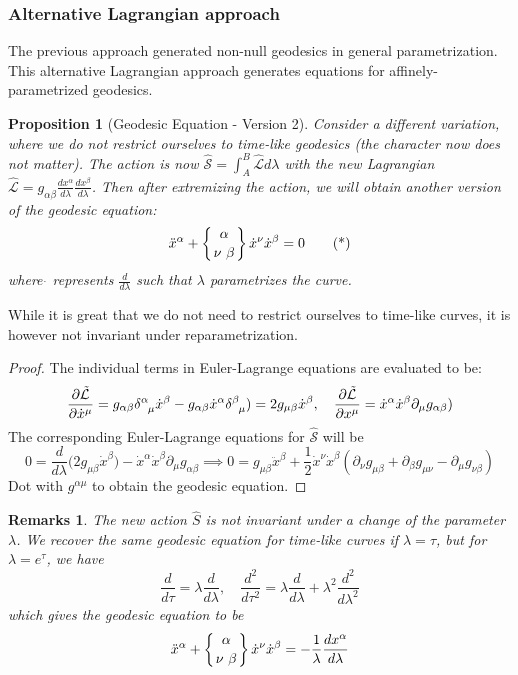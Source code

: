 \documentclass[a4paper]{article}
\newtheorem{remarks}{Remarks}[section]
\theoremstyle{new}
\newtheorem{prop}{Proposition}[section]
\begin{document}
\subsubsection*{Alternative Lagrangian approach}
The previous approach generated non-null geodesics in general parametrization. This alternative Lagrangian approach generates equations for affinely-parametrized geodesics.
\begin{prop}[Geodesic Equation - Version 2]
Consider a different variation, where we do not restrict ourselves to time-like geodesics (the character now does not matter). The action is now $\hat{\mathcal{S}}=\int_A^B\hat{\mathcal{L}}d\lambda$ with the new Lagrangian $\hat{\mathcal{L}}=g_{\alpha\beta}\frac{dx^\alpha}{d\lambda}\frac{dx^\beta}{d\lambda}$. Then after extremizing the action, we will obtain another version of the geodesic equation:
\begin{equation}
    \ddot{x}^\alpha+ \left \{ {\alpha \atop
\nu\ \beta}\right\} \dot{x}^\nu\dot{x}^\beta=0\tag{*}
\end{equation}
where $\dot{ }$ represents $\frac{d}{d\lambda}$ such that $\lambda$ parametrizes the curve. 
\end{prop}
While it is great that we do not need to restrict ourselves to time-like curves, it is however not invariant under reparametrization. 
\begin{proof}
The individual terms in Euler-Lagrange equations are evaluated to be:
$$\frac{\partial\tilde{\mathcal{L}}}{\partial\dot{x}^\mu}=g_{\alpha\beta}\tensor*{\delta}{*_{}^{\alpha}_{\mu}}\dot{x}^\beta-g_{\alpha\beta}\dot{x}^\alpha\tensor*{\delta}{*_{}^{\beta}_{\mu}})=2g_{\mu\beta}\dot{x}^\beta,\quad\frac{\partial\tilde{\mathcal{L}}}{\partial x^\mu}=\dot{x}^\alpha\dot{x}^\beta\partial_\mu g_{\alpha\beta})$$
The corresponding Euler-Lagrange equations for $\hat{\mathcal{S}}$ will be 
$$0=\frac{d}{d\lambda}\bigg(2g_{\mu\beta}\dot{x}^\beta\bigg)-\dot{x}^\alpha\dot{x}^\beta\partial_\mu g_{\alpha\beta}\implies 0=g_{\mu\beta}\ddot{x}^\beta+\frac{1}{2}\dot{x}^\nu\dot{x}^\beta(\partial_\nu g_{\mu\beta}+\partial_\beta g_{\mu\nu}-\partial_\mu g_{\nu\beta})$$
Dot with $g^{\alpha\mu}$ to obtain the geodesic equation.
\end{proof}
\begin{remarks}
The new action $\hat{S}$ is not invariant under a change of the parameter $\lambda$. We recover the same geodesic equation for time-like curves if $\lambda=\tau$, but for $\lambda=e^\tau$, we have
$$\frac{d}{d\tau}=\lambda\frac{d}{d\lambda},\quad\frac{d^2}{d\tau^2}=\lambda\frac{d}{d\lambda}+\lambda^2\frac{d^2}{d\lambda^2}$$
which gives the geodesic equation to be 
$$\ddot{x}^\alpha+\left \{ {\alpha \atop
\nu\ \beta}\right\}\dot{x}^\nu\dot{x}^\beta =-\frac{1}{\lambda}\frac{dx^\alpha}{d\lambda}$$
\end{remarks}
\end{document}
